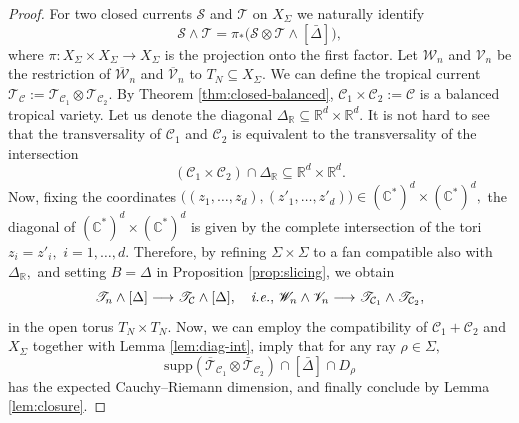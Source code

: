 \documentclass[11pt]{amsart}
\theoremstyle{definition}
\newcommand{\R}{\mathbb{R}}
\newcommand{\lto}{\longrightarrow}
\newcommand{\C}{\mathbb{C}}
\newcommand{\cC}{\mathcal{C}}
\newcommand{\sT}{\mathscr{T}}
\newcommand{\sS}{\mathscr{S}}
\newcommand{\sW}{\mathscr{W}}
\newcommand{\sV}{\mathscr{V}}
\newcommand{\supp}[1]{{\mathrm{supp}(#1)}}
\begin{document}
\begin{proof}
For two closed currents $\sS$ and $\sT$ on $X_{\Sigma}$ we naturally identify 
$$\sS \wedge \sT = \pi_* \big(\sS \otimes \sT  \wedge  [\bar{\Delta}]\big),$$
where $\pi: X_{\Sigma} \times X_{\Sigma} \lto X_{\Sigma}$ is the projection onto the first factor. Let $\sW_n$ and $\sV_n$ be the restriction of $\overline{\sW}_n$ and $\overline{\sV}_n$ to $T_N \subseteq X_{\Sigma}.$ 
We can define the tropical current $\sT_{\cC} := \sT_{\cC_1} \otimes \sT_{\cC_2}.$ By Theorem \ref{thm:closed-balanced}, $ \cC_1 \times \cC_2 := \cC $ is a balanced tropical variety. Let us denote the diagonal $\Delta_{\R} \subseteq \R^d \times \R^d.$ It is not hard to see that the transversality of $\cC_1$ and $\cC_2$ is equivalent to the transversality of the intersection 
$$(\cC_1 \times \cC_2) \cap \Delta_{\R} \subseteq \R^d \times \R^d.$$ 
Now, fixing the coordinates $\big((z_1, \dots ,z_d ), (z'_1, \dots , z'_d)\big) \in (\C^*)^d \times (\C^*)^d,$ the diagonal of $ (\C^*)^d \times (\C^*)^d$ is given by the complete intersection of the tori $z_i = z'_i,$ $i=1, \dots , d.$  Therefore, by refining $\Sigma \times \Sigma$ to a fan compatible also with $\Delta_{\R},$ and setting $B= \Delta$ in Proposition \ref{prop:slicing}, we obtain
$$
\sT_n \wedge [\Delta] \lto \sT_{\cC} \wedge [\Delta], \quad {\emph{i.e.}, }~  \sW_n \wedge \sV_n \lto \sT_{\cC_1} \wedge \sT_{\cC_2},
$$
in the open torus $T_N \times T_N.$ Now, we can employ the compatibility of $\cC_1 + \cC_2$ and $X_{\Sigma}$ together with Lemma \ref{lem:diag-int}, imply that for any ray $\rho \in \Sigma,$
$$
\supp{\overline{\sT}_{\cC_1} \otimes \overline{\sT}_{\cC_2}} \cap  [\bar{\Delta}] \cap D_{\rho}
$$
has the expected Cauchy--Riemann dimension, and finally conclude by Lemma \ref{lem:closure}.
\end{proof}





\end{document}
